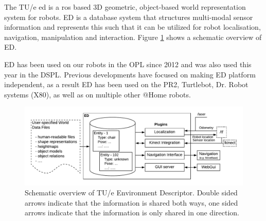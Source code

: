 \label{sec:ed}
The TU/e \acrfull{ed} is a \acrfull{ros} based 3D geometric, object-based world representation system for robots. ED is a database system that structures multi-modal sensor information and represents this such that it can be utilized for robot localisation, navigation, manipulation and interaction. Figure \ref{fig:ed} shows a schematic overview of ED.

\noindent ED has been used on our robots in the OPL since 2012 and was also used this year in the DSPL. Previous developments have focused on making ED platform independent, as a result ED has been used on the PR2, Turtlebot, Dr. Robot systems (X80), as well as on multiple other @Home robots.\\
\begin{figure}[H]
	\vspace{-0.5cm}
    \centering
	\includegraphics[width=\linewidth]{Figures/ed_overview.pdf}
    \vspace{-1em}
	\caption{Schematic overview of TU/e Environment Descriptor. Double sided arrows indicate that the information is shared both ways, one sided arrows indicate that the information is only shared in one direction.}
	\label{fig:ed}
    \vspace{-0.3cm}
\end{figure}

